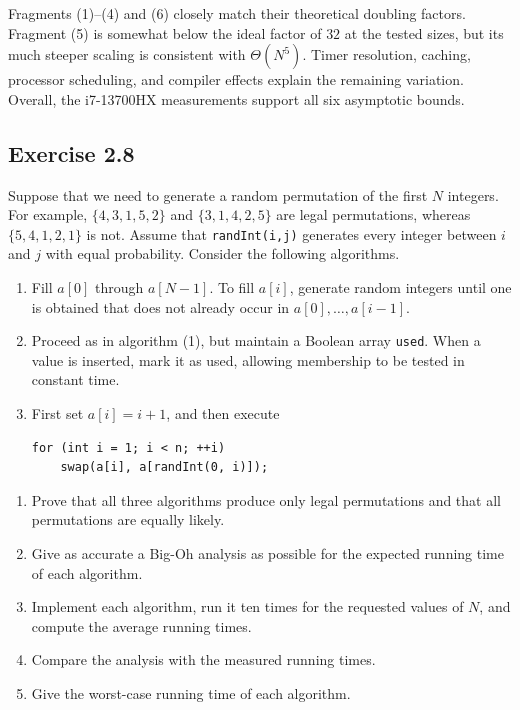 \documentclass[12pt,a4paper]{article}
\begin{document}
Fragments (1)--(4) and (6) closely match their theoretical doubling
factors. Fragment (5) is somewhat below the ideal factor of $32$ at the
tested sizes, but its much steeper scaling is consistent with
$\Theta(N^5)$. Timer resolution, caching, processor scheduling, and
compiler effects explain the remaining variation. Overall, the
i7-13700HX measurements support all six asymptotic bounds.

\clearpage
\subsection*{\color{sectionnavy}Exercise 2.8}

\noindent
Suppose that we need to generate a random permutation of the first $N$
integers. For example, $\{4,3,1,5,2\}$ and $\{3,1,4,2,5\}$ are legal
permutations, whereas $\{5,4,1,2,1\}$ is not. Assume that
\texttt{randInt(i,j)} generates every integer between $i$ and $j$ with
equal probability. Consider the following algorithms.

\begin{enumerate}
  \item Fill $a[0]$ through $a[N-1]$. To fill $a[i]$, generate random
  integers until one is obtained that does not already occur in
  $a[0],\ldots,a[i-1]$.

  \item Proceed as in algorithm (1), but maintain a Boolean array
  \texttt{used}. When a value is inserted, mark it as used, allowing
  membership to be tested in constant time.

  \item First set $a[i]=i+1$, and then execute
\begin{lstlisting}
for (int i = 1; i < n; ++i)
    swap(a[i], a[randInt(0, i)]);
\end{lstlisting}
\end{enumerate}

\begin{enumerate}
  \renewcommand{\labelenumi}{\alph{enumi}.}
  \item Prove that all three algorithms produce only legal
  permutations and that all permutations are equally likely.
  \item Give as accurate a Big-Oh analysis as possible for the expected
  running time of each algorithm.
  \item Implement each algorithm, run it ten times for the requested
  values of $N$, and compute the average running times.
  \item Compare the analysis with the measured running times.
  \item Give the worst-case running time of each algorithm.
\end{enumerate}
\end{document}
